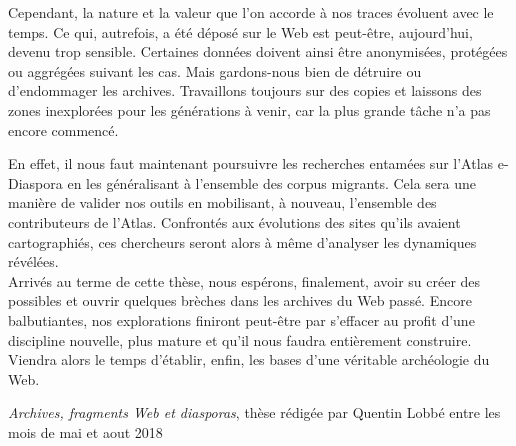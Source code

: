 \documentclass[symmetric,justified,marginals=raggedouter]{tufte-book}
\begin{document}
Cependant, la nature et la valeur que l'on accorde à nos traces évoluent avec le temps. Ce qui, autrefois, a été déposé sur le Web est peut-être, aujourd'hui, devenu trop sensible. Certaines données doivent ainsi être anonymisées, protégées ou aggrégées suivant les cas. Mais gardons-nous bien de détruire ou d'endommager les archives. Travaillons toujours sur des copies et laissons des zones inexplorées pour les générations à venir, car la plus grande tâche n'a pas encore commencé.

En effet, il nous faut maintenant poursuivre les recherches entamées sur l'Atlas e-Diaspora en les généralisant à l'ensemble des corpus migrants. Cela sera une manière de valider nos outils en mobilisant, à nouveau, l'ensemble des contributeurs de l'Atlas. Confrontés aux évolutions des sites qu'ils avaient cartographiés, ces chercheurs seront alors à même d'analyser les dynamiques révélées.\\

\noindent Arrivés au terme de cette thèse, nous espérons, finalement, avoir su créer des possibles et ouvrir quelques brèches dans les archives du Web passé. Encore balbutiantes, nos explorations finiront peut-être par s'effacer au profit d'une discipline nouvelle, plus mature et qu'il nous faudra entièrement construire. Viendra alors le temps d'établir, enfin, les bases d'une véritable archéologie du Web.   



\backmatter





\vfill 

\begin{fullwidth}
\hspace*{1.5em}\textit{Archives, fragments Web et diasporas}, thèse rédigée par Quentin Lobbé entre les mois de mai et aout 2018
\end{fullwidth}

\end{document}
